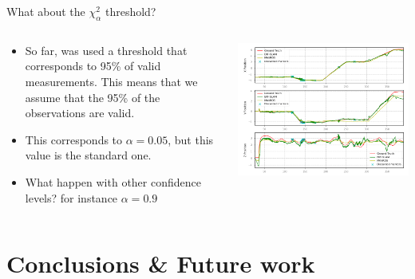 \documentclass[serif,aspectratio=169]{beamer}
\begin{document}
    \begin{frame}{What about the $\chi_{\alpha}^2$ threshold?}
        \begin{columns}[c]
            \begin{column}{.4\textwidth}
                \begin{itemize}
                    \item{So far, was used a threshold that corresponds to 95\% of valid measurements. This means that we assume that the 95\% of the observations are valid.}
                    \item{This corresponds to $\alpha = 0.05$, but this value is the standard one.}
                    \item{What happen with other confidence levels? for instance $\alpha = 0.9$}
                \end{itemize}
            \end{column}
            \begin{column}{.6\textwidth}
                \centering
                \includegraphics[height=0.8\textheight]{Images/fig24-nees-10-path-discarded-markers.png}
            \end{column}
        \end{columns}
    \end{frame}

    \section{Conclusions \& Future work}
\end{document}
